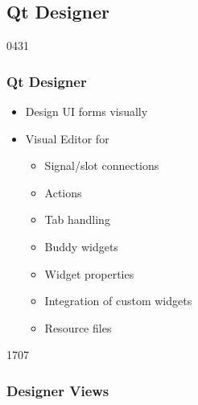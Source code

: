 %
%
%
%

\subsection{Qt Designer}
\newcommand{\uicProgram}{\iConcept{uic}\xspace}

\label{qt_designer}

\begin{slide}[fragile]{0431}\frametitle{Qt Designer}
  \begin{itemize}
\item Design UI forms visually
  \end{itemize}
  \vfill
 \begin{itemize}
 \item Visual Editor for
   \begin{itemize}
  \item Signal/slot connections
  \item Actions
  \item Tab handling
  \item Buddy widgets
  \item Widget properties
  \item Integration of custom widgets
  \item Resource files
  \end{itemize}
\end{itemize}
\end{slide}

\begin{slide}{1707}\frametitle{Designer Views}
\end{slide}

